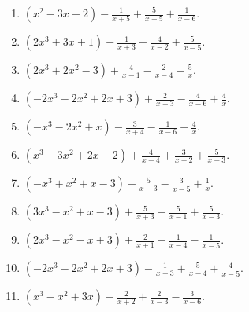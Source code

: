 \documentclass[11pt,oneside]{book}
\begin{document}
\begin{enumerate}[leftmargin=*,label=\textbf{Z\arabic*.},itemsep=0.45\baselineskip]
\item $\displaystyle \left(x^{2} - 3 x + 2\right) - \frac{1}{x + 5} + \frac{5}{x - 5} + \frac{1}{x - 6}$.
\item $\displaystyle \left(2 x^{3} + 3 x + 1\right) - \frac{1}{x + 3} - \frac{4}{x - 2} + \frac{5}{x - 5}$.
\item $\displaystyle \left(2 x^{3} + 2 x^{2} - 3\right) + \frac{4}{x - 1} - \frac{2}{x - 4} - \frac{5}{x}$.
\item $\displaystyle \left(- 2 x^{3} - 2 x^{2} + 2 x + 3\right) + \frac{2}{x - 3} - \frac{4}{x - 6} + \frac{4}{x}$.
\item $\displaystyle \left(- x^{3} - 2 x^{2} + x\right) - \frac{3}{x + 4} - \frac{1}{x - 6} + \frac{4}{x}$.
\item $\displaystyle \left(x^{3} - 3 x^{2} + 2 x - 2\right) + \frac{4}{x + 4} + \frac{3}{x + 2} + \frac{5}{x - 3}$.
\item $\displaystyle \left(- x^{3} + x^{2} + x - 3\right) + \frac{5}{x - 3} - \frac{3}{x - 5} + \frac{1}{x}$.
\item $\displaystyle \left(3 x^{3} - x^{2} + x - 3\right) + \frac{5}{x + 3} - \frac{5}{x - 1} + \frac{5}{x - 3}$.
\item $\displaystyle \left(2 x^{3} - x^{2} - x + 3\right) + \frac{2}{x + 1} + \frac{1}{x - 4} - \frac{1}{x - 5}$.
\item $\displaystyle \left(- 2 x^{3} - 2 x^{2} + 2 x + 3\right) - \frac{1}{x - 3} + \frac{5}{x - 4} + \frac{4}{x - 5}$.
\item $\displaystyle \left(x^{3} - x^{2} + 3 x\right) - \frac{2}{x + 2} + \frac{2}{x - 3} - \frac{3}{x - 6}$.
\end{enumerate}
\end{document}
